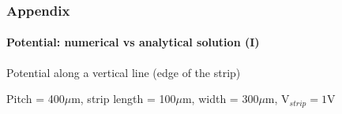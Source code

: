 \documentclass[14pt]{beamer}
\begin{document}
\begin{frame}
  \frametitle{Appendix}
  \framesubtitle{Potential: numerical vs analytical solution (I)}

  \fontsize{10pt}{7.2}\selectfont

  Potential along a vertical line (edge of the strip)

  Pitch = 400$\mu$m, strip length = 100$\mu$m, width = 300$\mu$m, V$_{strip} = 1$V

\vspace{-1.5em}

  \begin{columns}
      \begin{column}{0.5\textwidth}

        \begin{center}
        \end{center}
      \end{column}


\end{columns}
\end{frame}
\end{document}
